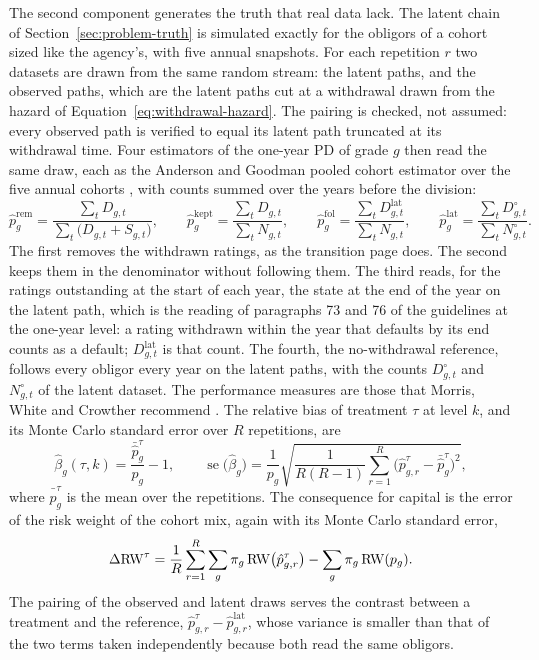 The second component generates the truth that real data lack. The latent chain of Section~\ref{sec:problem-truth} is simulated exactly for the obligors of a cohort sized like the agency's, with five annual snapshots. For each repetition $r$ two datasets are drawn from the same random stream: the latent paths, and the observed paths, which are the latent paths cut at a withdrawal drawn from the hazard of Equation~\eqref{eq:withdrawal-hazard}. The pairing is checked, not assumed: every observed path is verified to equal its latent path truncated at its withdrawal time. Four estimators of the one-year PD of grade $g$ then read the same draw, each as the Anderson and Goodman pooled cohort estimator over the five annual cohorts \citep{Anderson_1957}, with counts summed over the years before the division:
\begin{equation}
\hat p^{\mathrm{rem}}_g=\frac{\sum_t D_{g,t}}{\sum_t\bigl(D_{g,t}+S_{g,t}\bigr)},\qquad
\hat p^{\mathrm{kept}}_g=\frac{\sum_t D_{g,t}}{\sum_t N_{g,t}},\qquad
\hat p^{\mathrm{fol}}_g=\frac{\sum_t D^{\mathrm{lat}}_{g,t}}{\sum_t N_{g,t}},\qquad
\hat p^{\mathrm{lat}}_g=\frac{\sum_t D^{\circ}_{g,t}}{\sum_t N^{\circ}_{g,t}}.
\label{eq:estimators}
\end{equation}
The first removes the withdrawn ratings, as the transition page does. The second keeps them in the denominator without following them. The third reads, for the ratings outstanding at the start of each year, the state at the end of the year on the latent path, which is the reading of paragraphs 73 and 76 of the guidelines at the one-year level: a rating withdrawn within the year that defaults by its end counts as a default; $D^{\mathrm{lat}}_{g,t}$ is that count. The fourth, the no-withdrawal reference, follows every obligor every year on the latent paths, with the counts $D^{\circ}_{g,t}$ and $N^{\circ}_{g,t}$ of the latent dataset. The performance measures are those that Morris, White and Crowther recommend \citep{Morris_2019}. The relative bias of treatment $\tau$ at level $k$, and its Monte Carlo standard error over $R$ repetitions, are %
\begin{equation}
\hat\beta_g(\tau,k)=\frac{\bar{\hat p}^{\tau}_g}{p_g}-1,\qquad
\operatorname{se}\bigl(\hat\beta_g\bigr)=\frac{1}{p_g}\sqrt{\frac{1}{R(R-1)}\sum_{r=1}^{R}\bigl(\hat p^{\tau}_{g,r}-\bar{\hat p}^{\tau}_g\bigr)^{2}},
\label{eq:rel-bias}
\end{equation}
where $\bar{\hat p}^{\tau}_g$ is the mean over the repetitions. The consequence for capital is the error of the risk weight of the cohort mix, again with its Monte Carlo standard error,
\begin{equation}
\Delta\mathrm{RW}^{\tau}=\frac1R\sum_{r=1}^{R}\sum_{g}\pi_g\,\mathrm{RW}\bigl(\hat p^{\tau}_{g,r}\bigr)-\sum_{g}\pi_g\,\mathrm{RW}(p_g).
\label{eq:rw-error}
\end{equation}
The pairing of the observed and latent draws serves the contrast between a treatment and the reference, $\hat p^{\tau}_{g,r}-\hat p^{\mathrm{lat}}_{g,r}$, whose variance is smaller than that of the two terms taken independently because both read the same obligors.

